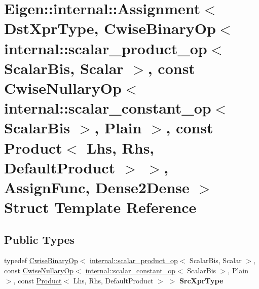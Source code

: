 \hypertarget{struct_eigen_1_1internal_1_1_assignment_3_01_dst_xpr_type_00_01_cwise_binary_op_3_01internal_1_1eb29cc77263dc530639098c389efc225}{}\section{Eigen\+::internal\+::Assignment$<$ Dst\+Xpr\+Type, Cwise\+Binary\+Op$<$ internal\+::scalar\+\_\+product\+\_\+op$<$ Scalar\+Bis, Scalar $>$, const Cwise\+Nullary\+Op$<$ internal\+::scalar\+\_\+constant\+\_\+op$<$ Scalar\+Bis $>$, Plain $>$, const Product$<$ Lhs, Rhs, Default\+Product $>$ $>$, Assign\+Func, Dense2\+Dense $>$ Struct Template Reference}
\label{struct_eigen_1_1internal_1_1_assignment_3_01_dst_xpr_type_00_01_cwise_binary_op_3_01internal_1_1eb29cc77263dc530639098c389efc225}
\subsection*{Public Types}
\begin{DoxyCompactItemize}
\item 
\mbox{\label{struct_eigen_1_1internal_1_1_assignment_3_01_dst_xpr_type_00_01_cwise_binary_op_3_01internal_1_1eb29cc77263dc530639098c389efc225_ab1c625f36159caa0534d2ef9147aaf25}} 
typedef \mbox{\hyperlink{class_eigen_1_1_cwise_binary_op}{Cwise\+Binary\+Op}}$<$ \mbox{\hyperlink{struct_eigen_1_1internal_1_1scalar__product__op}{internal\+::scalar\+\_\+product\+\_\+op}}$<$ Scalar\+Bis, Scalar $>$, const \mbox{\hyperlink{class_eigen_1_1_cwise_nullary_op}{Cwise\+Nullary\+Op}}$<$ \mbox{\hyperlink{struct_eigen_1_1internal_1_1scalar__constant__op}{internal\+::scalar\+\_\+constant\+\_\+op}}$<$ Scalar\+Bis $>$, Plain $>$, const \mbox{\hyperlink{class_eigen_1_1_product}{Product}}$<$ Lhs, Rhs, Default\+Product $>$ $>$ {\bfseries Src\+Xpr\+Type}
\end{DoxyCompactItemize}
